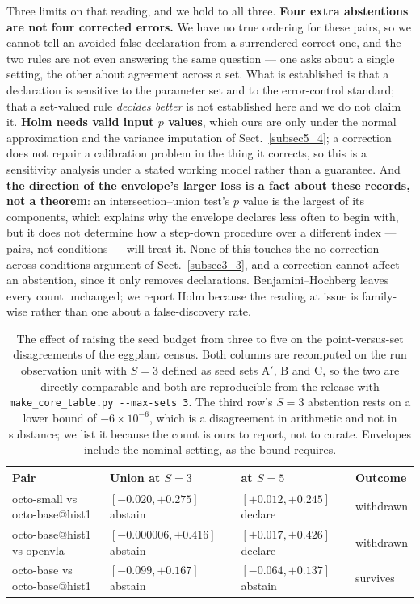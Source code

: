 \documentclass[pdflatex,iicol,sn-apa]{sn-jnl}
\theoremstyle{remark}
\begin{document}
Three limits on that reading, and we hold to all three. \textbf{Four extra abstentions are not four
corrected errors.} We have no true ordering for these pairs, so we cannot tell an avoided false
declaration from a surrendered correct one, and the two rules are not even answering the same
question --- one asks about a single setting, the other about agreement across a set. What is
established is that a declaration is sensitive to the parameter set and to the error-control
standard; that a set-valued rule \emph{decides better} is not established here and we do not claim
it. \textbf{Holm needs valid input $p$ values}, which ours are only under the normal approximation
and the variance imputation of Sect.~\ref{subsec5_4}; a correction does not repair a calibration
problem in the thing it corrects, so this is a sensitivity analysis under a stated working model
rather than a guarantee. And \textbf{the direction of the envelope's larger loss is a fact about
these records, not a theorem}: an intersection--union test's $p$ value is the largest of its
components, which explains why the envelope declares less often to begin with, but it does not
determine how a step-down procedure over a different index --- pairs, not conditions --- will treat
it. None of this touches the no-correction-across-conditions argument of Sect.~\ref{subsec3_3}, and
a correction cannot affect an abstention, since it only removes declarations. Benjamini--Hochberg
leaves every count unchanged; we report Holm because the reading at issue is family-wise rather than
one about a false-discovery rate.

\begin{table}[t]
\caption{The effect of raising the seed budget from three to five on the point-versus-set
disagreements of the eggplant census. Both columns are recomputed on the run observation unit with
$S=3$ defined as seed sets A$'$, B and C, so the two are directly comparable and both are
reproducible from the release with \texttt{make\_core\_table.py -}\texttt{-max-sets 3}. The third
row's $S=3$ abstention rests on a lower bound of $-6\times10^{-6}$, which is a disagreement in
arithmetic and not in substance; we list it because the count is ours to report, not to curate. Envelopes include the nominal setting, as the bound requires.}\label{tab6}
\begin{tabular}{@{}llll@{}}
\toprule
Pair & Union at $S=3$ & at $S=5$ & Outcome \\
\midrule
octo-small vs octo-base@hist1 & $[-0.020, +0.275]$ abstain & $[+0.012, +0.245]$ declare & withdrawn \\
octo-base@hist1 vs openvla & $[-0.000006, +0.416]$ abstain & $[+0.017, +0.426]$ declare & withdrawn \\
octo-base vs octo-base@hist1 & $[-0.099, +0.167]$ abstain & $[-0.064, +0.137]$ abstain & survives \\
\bottomrule
\end{tabular}
\end{table}
\end{document}
